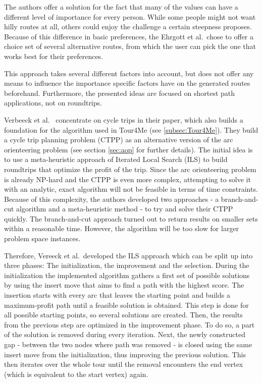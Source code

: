 The authors offer a solution for the fact that many of the values can have a different level of importance for every person. 
While some people might not want hilly routes at all, others could enjoy the challenge a certain steepness proposes. 
Because of this difference in basic preferences, the Ehrgott et al.\ chose to offer a choice set of several alternative routes, from which the user can pick the one that works best for their preferences. 

This approach takes several different factors into account, but does not offer any means to influence the importance specific factors have on the generated routes beforehand.
Furthermore, the presented ideas are focused on shortest path applications, not on roundtrips.

Verbeeck et al.\ \cite{verbeeck_extension_2014} concentrate on cycle trips in their paper, which also builds a foundation for the algorithm used in Tour4Me (see \ref{subsec:Tour4Me}). 
They build a \glqq cycle trip planning problem (CTPP)\grqq{} as an alternative version of the arc orienteering problem (see section \ref{sec:aop} for further details). 
The initial idea is to use a meta-heuristic approach of Iterated Local Search (ILS) to build roundtrips that optimize the profit of the trip.
Since the arc orienteering problem is already NP-hard and the CTPP is even more complex, attempting to solve it with an analytic, exact algorithm will not be feasible in terms of time constraints. 
Because of this complexity, the authors developed two approaches - a branch-and-cut algorithm and a meta-heuristic method - to try and solve their CTPP quickly. 
The branch-and-cut approach turned out to return results on smaller sets within a reasonable time.
However, the algorithm will be too slow for larger problem space instances.

Therefore, Vereeck et al.\ developed the ILS approach which can be split up into three phases:
The initialization, the improvement and the selection.
During the initialization the implemented algorithm gathers a first set of possible solutions by using the insert move that aims to find a path with the highest score.
The insertion starts with every arc that leaves the starting point and builds a maximum-profit path until a feasible solution is obtained.
This step is done for all possible starting points, so several solutions are created.
Then, the results from the previous step are optimized in the improvement phase. 
To do so, a part of the solution is removed during every iteration.
Next, the newly constructed gap - between the two nodes where path was removed - is closed using the same insert move from the initialization, thus improving the previous solution.
This then iterates over the whole tour until the removal encounters the end vertex (which is equivalent to the start vertex) again.

